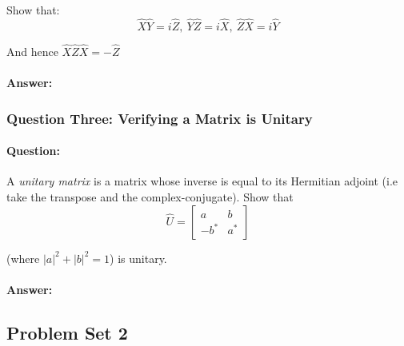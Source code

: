 \documentclass[reprint, amsmath,amssymb, aps]{revtex4-2}
\begin{document}
                Show that:
                \begin{equation*}
                    \hat{X}\hat{Y} = i\hat{Z}, \ \hat{Y}\hat{Z} = i\hat{X}, \ \hat{Z}\hat{X} = i\hat{Y}
                \end{equation*}

                And hence $\hat{X}\hat{Z}\hat{X} = -\hat{Z}$

                \begin{mdframed}
                    \paragraph{Answer:}

                    
                \end{mdframed}

            \subsubsection{Question Three: Verifying a Matrix is Unitary}
                \paragraph{Question:}
                
                A \textit{unitary matrix} is a matrix whose inverse is equal to its Hermitian adjoint (i.e take the transpose and the complex-conjugate). Show that 
                \begin{equation*}
                    \hat{U} = \begin{bmatrix}a & b \\ -b^* & a^*\end{bmatrix}
                \end{equation*}

                (where $|a|^2 + |b|^2 = 1$) is unitary.

                \begin{mdframed}
                    \paragraph{Answer:}

                    
                \end{mdframed}


        \subsection{Problem Set 2}
\end{document}
